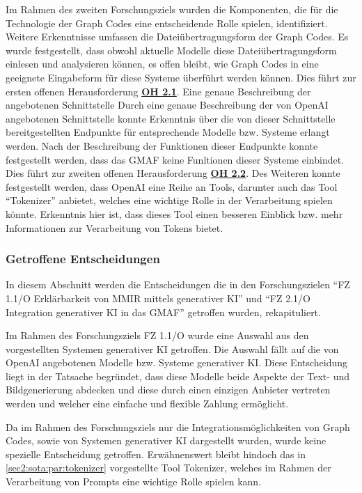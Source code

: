 Im Rahmen des zweiten Forschungsziels wurden die Komponenten, die für die Technologie der Graph Codes eine entscheidende Rolle spielen, identifiziert.
Weitere Erkenntnisse umfassen die Dateiübertragungsform der Graph Codes.
Es wurde festgestellt, dass obwohl aktuelle Modelle diese Dateiübertragungsform einlesen und analysieren können, es offen bleibt, wie Graph Codes in eine geeignete Eingabeform für diese Systeme überführt werden können.
Dies führt zur ersten offenen Herausforderung \hyperref[sec2:sota:oi:2.1]{\textbf{OH 2.1}}.
Eine genaue Beschreibung der angebotenen Schnittstelle
Durch eine genaue Beschreibung der von OpenAI angebotenen Schnittstelle konnte Erkenntnis über die von dieser Schnittstelle bereitgestellten Endpunkte für entsprechende Modelle bzw. Systeme erlangt werden.
Nach der Beschreibung der Funktionen dieser Endpunkte konnte festgestellt werden, dass das GMAF keine Funltionen dieser Systeme einbindet.
Dies führt zur zweiten offenen Herausforderung \hyperref[sec2:sota:oi:2.2]{\textbf{OH 2.2}}.
Des Weiteren konnte festgestellt werden, dass OpenAI eine Reihe an Tools, darunter auch das Tool \enquote{Tokenizer} anbietet, welches eine wichtige Rolle in der Verarbeitung spielen könnte.
Erkenntnis hier ist, dass dieses Tool einen besseren Einblick bzw. mehr Informationen zur Verarbeitung von Tokens bietet.

\subsubsection{Getroffene Entscheidungen}
\label{sec2:sota:subsubsec:summary-decisions}
In diesem Abschnitt werden die Entscheidungen die in den Forschungszielen \enquote{FZ 1.1/O Erklärbarkeit von MMIR mittels generativer KI} und \enquote{FZ 2.1/O Integration generativer KI in das GMAF} getroffen wurden, rekapituliert.

Im Rahmen des Forschungsziels FZ 1.1/O wurde eine Auswahl aus den vorgestellten Systemen generativer KI getroffen.
Die Auswahl fällt auf die von OpenAI angebotenen Modelle bzw. Systeme generativer KI.
Diese Entscheidung liegt in der Tatsache begründet, dass diese Modelle beide Aspekte der Text- und Bildgenerierung abdecken und diese durch einen einzigen Anbieter vertreten werden und welcher eine einfache und flexible Zahlung ermöglicht.

Da im Rahmen des Forschungsziels nur die Integrationsmöglichkeiten von Graph Codes, sowie von Systemen generativer KI dargestellt wurden, wurde keine spezielle Entscheidung getroffen.
Erwähnenswert bleibt hindoch das in \cref{sec2:sota:par:tokenizer} vorgestellte Tool Tokenizer, welches im Rahmen der Verarbeitung von Prompts eine wichtige Rolle spielen kann.

